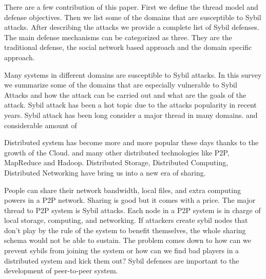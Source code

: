 \documentclass[conference]{IEEEtran}
\begin{document}
There are a few contribution of this paper. First we define the thread model and defense objectives. Then we list some of the domains that are susceptible to Sybil attacks.
After describing the attacks we provide a complete list of Sybil defenses. The main defense mechanisms can be categorized as three. They are the traditional defense, the social 
network based approach and the domain specific approach. 

Many systems in different domains are susceptible to Sybil attacks. In this survey we summarize some of the domains that are especially vulnerable to Sybil Attacks and how
the attack can be carried out and what are the goals of the attack.
Sybil attack has been a hot topic due to the attacks popularity in recent years. 
Sybil attack has been long consider a major thread in many domains. and considerable amount of 

Distributed system has become more and more popular these days thanks to the growth of the Cloud. and many other distributed technologies like P2P, MapReduce and Hadoop. 
Distributed Storage, Distributed Computing, Distributed Networking have bring us into
a new era of sharing. 

People can share their network bandwidth, local files, and extra computing powers in a P2P network. 
Sharing is good but it comes with a price. The major thread to P2P system is Sybil attacks.
Each node in a P2P system is in charge of local storage, computing, and networking.
If attackers create sybil nodes that don't play by the rule of the system to benefit themselves, the whole sharing schema would not be able to sustain.
The problem comes down to how can we prevent sybils from joining the system or how can we find bad players in a distributed system and kick them out?
Sybil defenses are important to the development of peer-to-peer system. 
\end{document}
